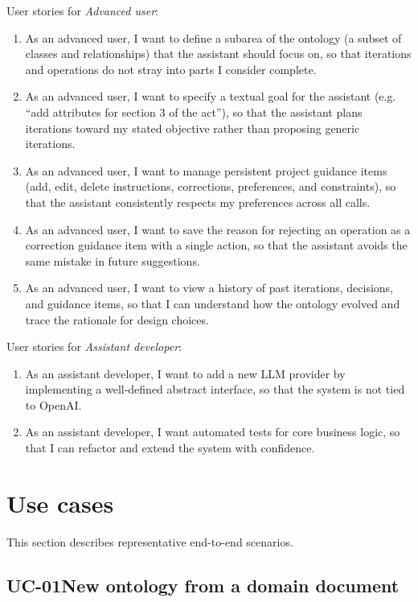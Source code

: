 \documentclass{article}
\def\twodigits#1{%
    \ifnum#1<10 0\fi
    \number#1}%
\begin{document}
User stories for \textit{Advanced user}:
\begin{enumerate}[resume,label=\textbf{US-\protect\twodigits{\arabic*}:},align=left,leftmargin=1.4cm]
  \item As an advanced user, I want to define a subarea of the ontology (a subset of classes and relationships) that the assistant should focus on, so that iterations and operations do not stray into parts I consider complete.
  \item As an advanced user, I want to specify a textual goal for the assistant (e.g. ``add attributes for section 3 of the act''), so that the assistant plans iterations toward my stated objective rather than proposing generic iterations.
  \item As an advanced user, I want to manage persistent project guidance items (add, edit, delete instructions, corrections, preferences, and constraints), so that the assistant consistently respects my preferences across all calls.
  \item As an advanced user, I want to save the reason for rejecting an operation as a correction guidance item with a single action, so that the assistant avoids the same mistake in future suggestions.
  \item As an advanced user, I want to view a history of past iterations, decisions, and guidance items, so that I can understand how the ontology evolved and trace the rationale for design choices.
\end{enumerate}

User stories for \textit{Assistant developer}:
\begin{enumerate}[resume,label=\textbf{US-\protect\twodigits{\arabic*}:},align=left,leftmargin=1.4cm]
  \item As an assistant developer, I want to add a new LLM provider by implementing a well-defined abstract interface, so that the system is not tied to OpenAI.
  \item As an assistant developer, I want automated tests for core business logic, so that I can refactor and extend the system with confidence.
\end{enumerate}

\section{Use cases}
\label{sec:use-cases}

This section describes representative end-to-end scenarios.

\subsection{UC-01\quad New ontology from a domain document}
\label{sec:uc-01}
\end{document}
